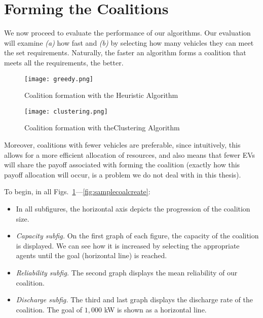 \section{Forming the Coalitions}
We now proceed to evaluate the performance of our algorithms. Our evaluation will examine {\em (a)} how fast and {\em (b)} by selecting how many vehicles they can meet the set requirements. Naturally, the faster an algorithm forms a coalition that meets all the requirements, the better. 
\begin{figure}
	\centering
		\texttt{[image: greedy.png]}
		\caption{Coalition formation with the\newline
			Heuristic Algorithm \label{fig:heuristiccoalcreate}}
\end{figure}
\begin{figure}	
	\centering
		\texttt{[image: clustering.png]}
		\caption{Coalition formation with the\newline Clustering Algorithm\label{fig:clusteringcoalcreate}}
\end{figure}

Moreover, coalitions with fewer vehicles are preferable, since intuitively, this allows for a more efficient allocation of resources, and also means that fewer EVs will share the payoff associated with forming the coalition (exactly how this payoff allocation will occur, is a problem we do not deal with in this thesis).

To begin, in all Figs.~\ref{fig:heuristiccoalcreate}---\ref{fig:samplecoalcreate}:
\begin{itemize}
	\item In all subfigures, the horizontal axis depicts the progression of the coalition size.
	\item {\em Capacity subfig.} On the first graph of each figure, the capacity of the coalition is displayed. We can see how it is increased by selecting the appropriate agents until the goal (horizontal line) is reached.
	\item {\em Reliability subfig.} The second graph displays the mean reliability of our coalition.
	\item {\em Discharge subfig.} The third and last graph displays the discharge rate of the coalition. The goal of $1,000$ kW is shown as a horizontal line.
\end{itemize}
